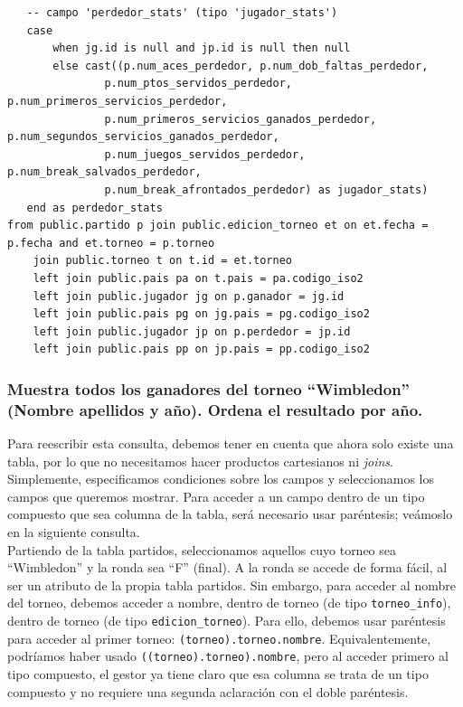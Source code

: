 \begin{verbatim}
   -- campo 'perdedor_stats' (tipo 'jugador_stats')
   case
       when jg.id is null and jp.id is null then null
       else cast((p.num_aces_perdedor, p.num_dob_faltas_perdedor,
           	   p.num_ptos_servidos_perdedor, p.num_primeros_servicios_perdedor,
           	   p.num_primeros_servicios_ganados_perdedor, p.num_segundos_servicios_ganados_perdedor,
           	   p.num_juegos_servidos_perdedor, p.num_break_salvados_perdedor,
           	   p.num_break_afrontados_perdedor) as jugador_stats)
   end as perdedor_stats
from public.partido p join public.edicion_torneo et on et.fecha = p.fecha and et.torneo = p.torneo 
	join public.torneo t on t.id = et.torneo
	left join public.pais pa on t.pais = pa.codigo_iso2
	left join public.jugador jg on p.ganador = jg.id
	left join public.pais pg on jg.pais = pg.codigo_iso2
	left join public.jugador jp on p.perdedor = jp.id
	left join public.pais pp on jp.pais = pp.codigo_iso2
\end{verbatim}



\subsubsection{Muestra todos los ganadores del torneo ``Wimbledon'' (Nombre apellidos y año). Ordena el resultado por año.}

Para reescribir esta consulta, debemos tener en cuenta que ahora solo existe una tabla, por lo que no necesitamos hacer productos cartesianos ni \textit{joins}. Simplemente, especificamos condiciones sobre los campos y seleccionamos los campos que queremos mostrar. Para acceder a un campo dentro de un tipo compuesto que sea columna de la tabla, será necesario usar paréntesis; veámoslo en la siguiente consulta. \\

Partiendo de la tabla partidos, seleccionamos aquellos cuyo torneo sea ``Wimbledon'' y la ronda sea ``F'' (final). A la ronda se accede de forma fácil, al ser un atributo de la propia tabla partidos. Sin embargo, para acceder al nombre del torneo, debemos acceder a nombre, dentro de torneo (de tipo \texttt{torneo\_info}), dentro de torneo (de tipo \texttt{edicion\_torneo}). Para ello, debemos usar paréntesis para acceder al primer torneo: \texttt{(torneo).torneo.nombre}. Equivalentemente, podríamos haber usado \texttt{((torneo).torneo).nombre}, pero al acceder primero al tipo compuesto, el gestor ya tiene claro que esa columna se trata de un tipo compuesto y no requiere una segunda aclaración con el doble paréntesis. \\

